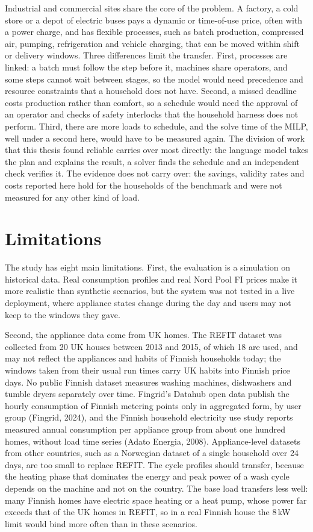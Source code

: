 \documentclass[12pt,a4paper]{report}
\begin{document}
Industrial and commercial sites share the core of the problem. A
factory, a cold store or a depot of electric buses pays a dynamic or
time-of-use price, often with a power charge, and has flexible
processes, such as batch production, compressed air, pumping,
refrigeration and vehicle charging, that can be moved within shift or
delivery windows. Three differences limit the transfer. First, processes
are linked: a batch must follow the step before it, machines share
operators, and some steps cannot wait between stages, so the model would
need precedence and resource constraints that a household does not
have. Second, a missed deadline costs production rather than comfort,
so a schedule would need the approval of an operator and checks of
safety interlocks that the household harness does not perform. Third,
there are more loads to schedule, and the solve time of the MILP, well
under a second here, would have to be measured again. The division of
work that this thesis found reliable carries over most directly: the
language model takes the plan and explains the result, a solver finds
the schedule and an independent check verifies it. The evidence does not
carry over: the savings, validity rates and costs reported here hold for
the households of the benchmark and were not measured for any other kind
of load.

\section{Limitations}
\label{sec:limitations}

The study has eight main limitations. First, the evaluation is a
simulation on historical data. Real consumption profiles and real Nord
Pool FI prices make it more realistic than synthetic scenarios, but the
system was not tested in a live deployment, where appliance states
change during the day and users may not keep to the windows they gave.

Second, the appliance data come from UK homes. The REFIT dataset was
collected from 20 UK houses between 2013 and 2015, of which 18 are used,
and may not reflect the appliances and habits of Finnish households
today; the windows taken from their usual run times carry UK habits into
Finnish price days. No public Finnish dataset measures washing machines,
dishwashers and tumble dryers separately over time. Fingrid's Datahub
open data publish the hourly consumption of Finnish metering points only
in aggregated form, by user group (Fingrid, 2024), and the Finnish
household electricity use study reports measured annual consumption per
appliance group from about one hundred homes, without load time series
(Adato Energia, 2008). Appliance-level datasets from other countries,
such as a Norwegian dataset of a single household over 24 days, are too
small to replace REFIT. The cycle profiles should transfer, because the
heating phase that dominates the energy and peak power of a wash cycle
depends on the machine and not on the country. The base load transfers
less well: many Finnish homes have electric space heating or a heat
pump, whose power far exceeds that of the UK homes in REFIT, so in a
real Finnish house the 8\,kW limit would bind more often than in these
scenarios.
\end{document}

